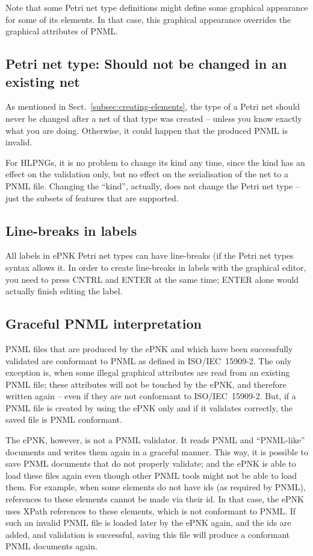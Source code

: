 Note that some Petri net type definitions might define some graphical appearance
for some of its elements. In that case, this graphical appearance overrides the
graphical attributes of PNML.

\subsection{Petri net type: Should not be changed in an existing net}

As mentioned in Sect.~\ref{subsec:creating-elements}, the type of a Petri net
should never be changed after a net of that type was created --
unless you know exactly what you are doing. Otherwise, it could happen
that the produced PNML is invalid.

For HLPNGs, it is no problem to change its kind any time, since the
kind has an effect on the validation only, but no effect on the
serialisation of the net to a PNML file. Changing the ``kind'', actually,
does not change the Petri net type -- just the subsets of features that
are supported.

 
\subsection{Line-breaks in labels}

All labels in ePNK Petri net types can have line-breaks (if the Petri net types
syntax allows it. In order to create line-breaks in labels with the graphical editor, 
you need to press CNTRL and ENTER at the same time; ENTER alone would actually
finish editing the label.

\subsection{Graceful PNML interpretation}  
\label{subsec:graceful-PNML}

PNML files that are produced by the ePNK and which have been successfully
validated are conformant to PNML as defined in ISO/IEC~15909-2. The
only exception is, when some illegal graphical attributes are read from an
existing PNML file; these attributes will not be touched by the ePNK, and
therefore written again -- even if they are not conformant to ISO/IEC~15909-2.
But, if a PNML file is created by using the ePNK only and if it validates
correctly, the saved file is PNML conformant.

The ePNK, however, is not a PNML validator. It reads PNML and ``PNML-like''
documents and writes them again in a graceful manner. This way, it is possible
to save PNML documents that do not properly validate; and the ePNK is able to
load these files again even though other PNML tools might not be able to
load them. For example, when some elements do not have ids (as required
by PNML), references to these elements cannot be made via their id. In that
case, the ePNK uses XPath references to these elements, which is not conformant
to PNML. If such an invalid PNML file is loaded later by the ePNK again,
and the ids are added, and validation is successful, saving this
file  will produce a conformant PNML documents again.

